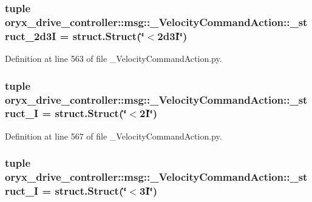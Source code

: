 \subsubsection[{\-\_\-struct\-\_\-2d3\-I}]{\setlength{\rightskip}{0pt plus 5cm}tuple {\bf oryx\-\_\-drive\-\_\-controller\-::msg\-::\-\_\-\-Velocity\-Command\-Action\-::\-\_\-struct\-\_\-2d3\-I} = struct.\-Struct(\char`\"{}$<$2d3\-I\char`\"{})}\label{namespaceoryx__drive__controller_1_1msg_1_1__VelocityCommandAction_a348ba4749789570a7ce387e6bb9cd989}


\-Definition at line 563 of file \-\_\-\-Velocity\-Command\-Action.\-py.

\subsubsection[{\-\_\-struct\-\_\-2\-I}]{\setlength{\rightskip}{0pt plus 5cm}tuple {\bf oryx\-\_\-drive\-\_\-controller\-::msg\-::\-\_\-\-Velocity\-Command\-Action\-::\-\_\-struct\-\_\-I} = struct.\-Struct(\char`\"{}$<$2\-I\char`\"{})}\label{namespaceoryx__drive__controller_1_1msg_1_1__VelocityCommandAction_af5ca79384398fc80456ba150a77d2a44}


\-Definition at line 567 of file \-\_\-\-Velocity\-Command\-Action.\-py.

\subsubsection[{\-\_\-struct\-\_\-3\-I}]{\setlength{\rightskip}{0pt plus 5cm}tuple {\bf oryx\-\_\-drive\-\_\-controller\-::msg\-::\-\_\-\-Velocity\-Command\-Action\-::\-\_\-struct\-\_\-I} = struct.\-Struct(\char`\"{}$<$3\-I\char`\"{})}\label{namespaceoryx__drive__controller_1_1msg_1_1__VelocityCommandAction_a956f917d5c14bf08bed8e99ebf96a62c}


